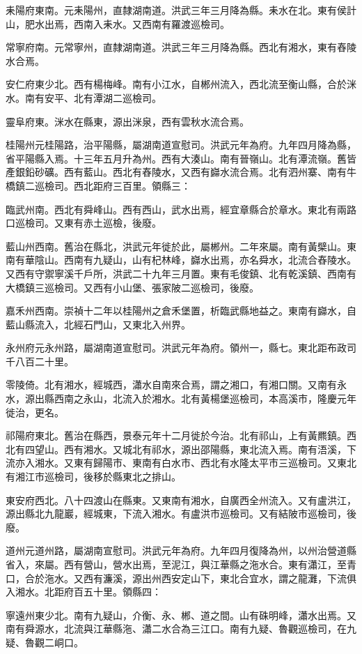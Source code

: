 耒陽府東南。元耒陽州，直隸湖南道。洪武三年三月降為縣。耒水在北。東有侯計山，肥水出焉，西南入耒水。又西南有羅渡巡檢司。

常寧府南。元常寧州，直隸湖南道。洪武三年三月降為縣。西北有湘水，東有舂陵水合焉。

安仁府東少北。西有楊梅峰。南有小江水，自郴州流入，西北流至衡山縣，合於洣水。南有安平、北有潭湖二巡檢司。

靈阜府東。洣水在縣東，源出洣泉，西有雲秋水流合焉。

桂陽州元桂陽路，治平陽縣，屬湖南道宣慰司。洪武元年為府。九年四月降為縣，省平陽縣入焉。十三年五月升為州。西有大湊山。南有晉嶺山。北有潭流嶺。舊皆產銀鉛砂礦。西有藍山。西北有舂陵水，又西有巋水流合焉。北有泗州寨、南有牛橋鎮二巡檢司。西北距府三百里。領縣三：

臨武州南。西北有舜峰山。西有西山，武水出焉，經宜章縣合於章水。東北有兩路口巡檢司。又東有赤土巡檢，後廢。

藍山州西南。舊治在縣北，洪武元年徙於此，屬郴州。二年來屬。南有黃檗山。東南有華陰山。西南有九疑山，山有杞林峰，巋水出焉，亦名舜水，北流合舂陵水。又西有守禦寧溪千戶所，洪武二十九年三月置。東有毛俊鎮、北有乾溪鎮、西南有大橋鎮三巡檢司。又西有小山堡、張家陂二巡檢司，後廢。

嘉禾州西南。崇禎十二年以桂陽州之倉禾堡置，析臨武縣地益之。東南有巋水，自藍山縣流入，北經石門山，又東北入州界。

永州府元永州路，屬湖南道宣慰司。洪武元年為府。領州一，縣七。東北距布政司千八百二十里。

零陵倚。北有湘水，經城西，瀟水自南來合焉，謂之湘口，有湘口關。又南有永水，源出縣西南之永山，北流入於湘水。北有黃楊堡巡檢司，本高溪市，隆慶元年徙治，更名。

祁陽府東北。舊治在縣西，景泰元年十二月徙於今治。北有祁山，上有黃羆鎮。西北有四望山。西有湘水。又城北有祁水，源出邵陽縣，東北流入焉。南有浯溪，下流亦入湘水。又東有歸陽市、東南有白水市、西北有水隆太平市三巡檢司。又東北有湘江市巡檢司，後移於縣東北之排山。

東安府西北。八十四渡山在縣東。又東南有湘水，自廣西全州流入。又有盧洪江，源出縣北九龍巖，經城東，下流入湘水。有盧洪市巡檢司。又有結陂市巡檢司，後廢。

道州元道州路，屬湖南宣慰司。洪武元年為府。九年四月復降為州，以州治營道縣省入，來屬。西有營山，營水出焉，至泥江，與江華縣之沲水合。東有瀟江，至青口，合於沲水。又西有濂溪，源出州西安定山下，東北合宜水，謂之龍灘，下流俱入湘水。北距府百五十里。領縣四：

寧遠州東少北。南有九疑山，介衡、永、郴、道之間。山有硃明峰，瀟水出焉。又南有舜源水，北流與江華縣沲、瀟二水合為三江口。南有九疑、魯觀巡檢司，在九疑、魯觀二峒口。

